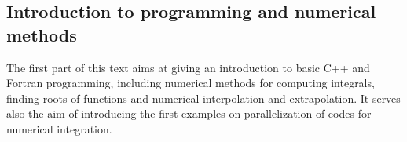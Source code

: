 % 
%
%

\begin{partbacktext}
\part{Introduction to programming and numerical methods}
The first part of this text aims at giving an introduction to basic C++ and Fortran programming, including numerical methods for computing integrals, finding
roots of functions and numerical interpolation and extrapolation.  It serves also the aim of introducing the first examples on parallelization of codes for numerical integration.
\end{partbacktext}
